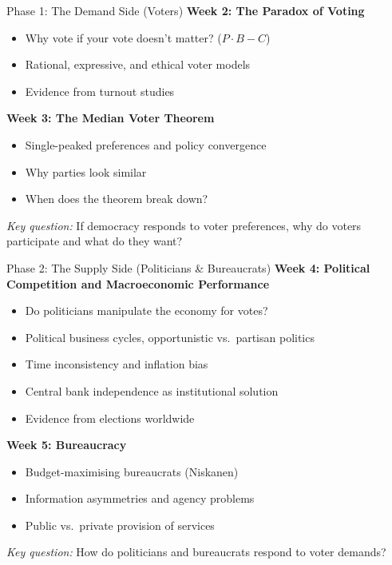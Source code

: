 \documentclass[10pt]{beamer}
\begin{document}
\begin{frame}{Phase 1: The Demand Side (Voters)}
\textbf{Week 2: The Paradox of Voting}
\begin{itemize}
\item Why vote if your vote doesn't matter? ($P \cdot B - C$)
\item Rational, expressive, and ethical voter models
\item Evidence from turnout studies
\end{itemize}


\textbf{Week 3: The Median Voter Theorem}
\begin{itemize}
\item Single-peaked preferences and policy convergence
\item Why parties look similar
\item When does the theorem break down?
\end{itemize}


\textit{Key question:} If democracy responds to voter preferences, why do voters participate and what do they want?
\end{frame}

\begin{frame}{Phase 2: The Supply Side (Politicians \& Bureaucrats)}
\textbf{Week 4: Political Competition and Macroeconomic Performance}
\begin{itemize}
\item Do politicians manipulate the economy for votes?
\item Political business cycles, opportunistic vs.\ partisan politics
\item Time inconsistency and inflation bias
\item Central bank independence as institutional solution
\item Evidence from elections worldwide
\end{itemize}

\vspace{0.5cm}

\textbf{Week 5: Bureaucracy}
\begin{itemize}
\item Budget-maximising bureaucrats (Niskanen)
\item Information asymmetries and agency problems
\item Public vs.\ private provision of services
\end{itemize}

\vspace{0.5cm}

\textit{Key question:} How do politicians and bureaucrats respond to voter demands?
\end{frame}
\end{document}
